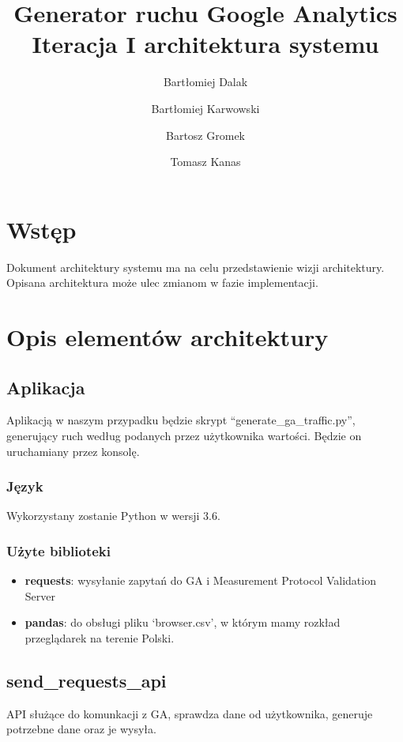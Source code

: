 \documentclass{article}
\title{Generator ruchu Google Analytics \\ Iteracja I architektura systemu}
\author{Bartłomiej Dalak \and Bartłomiej Karwowski \and Bartosz Gromek \and Tomasz Kanas}
\begin{document}
\maketitle

\section{Wstęp}

Dokument architektury systemu ma na celu przedstawienie wizji architektury. Opisana architektura może ulec zmianom w fazie implementacji.

\section{Opis elementów architektury}

\subsection{Aplikacja}

Aplikacją w naszym przypadku będzie skrypt ``generate\_ga\_traffic.py'', generujący ruch według podanych przez użytkownika wartości. Będzie on uruchamiany przez konsolę.

\subsubsection{Język}

Wykorzystany zostanie Python w wersji 3.6.

\subsubsection{Użyte biblioteki}

\begin{itemize}
\item \textbf{requests}: wysyłanie zapytań do GA i Measurement Protocol Validation Server
\item \textbf{pandas}: do obsługi pliku `browser.csv', w którym mamy rozkład przeglądarek na terenie Polski.
\end{itemize}

\subsection{send\_requests\_api}
API służące do komunkacji z GA, sprawdza dane od użytkownika, generuje potrzebne dane oraz je wysyła.
\end{document}
